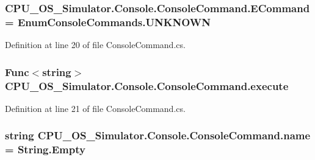 \subsubsection[{E\+Command}]{ C\+P\+U\+\_\+\+O\+S\+\_\+\+Simulator.\+Console.\+Console\+Command.\+E\+Command = {\bf Enum\+Console\+Commands.\+U\+N\+K\+N\+O\+W\+N}\hspace{0.3cm}{\ttfamily [private]}}\label{class_c_p_u___o_s___simulator_1_1_console_1_1_console_command_a623b0c35b5b676fa1931c62dde508486}


Definition at line 20 of file Console\+Command.\+cs.

\hypertarget{class_c_p_u___o_s___simulator_1_1_console_1_1_console_command_a14965572ab7b76a453e1dd49d268b48a}{}
\subsubsection[{execute}]{\setlength{\rightskip}{0pt plus 5cm}Func$<$string$>$ C\+P\+U\+\_\+\+O\+S\+\_\+\+Simulator.\+Console.\+Console\+Command.\+execute\hspace{0.3cm}{\ttfamily [private]}}\label{class_c_p_u___o_s___simulator_1_1_console_1_1_console_command_a14965572ab7b76a453e1dd49d268b48a}


Definition at line 21 of file Console\+Command.\+cs.

\hypertarget{class_c_p_u___o_s___simulator_1_1_console_1_1_console_command_a0ba819d58268ef4f9bab12089a9fd1a4}{}
\subsubsection[{name}]{\setlength{\rightskip}{0pt plus 5cm}string C\+P\+U\+\_\+\+O\+S\+\_\+\+Simulator.\+Console.\+Console\+Command.\+name = String.\+Empty\hspace{0.3cm}{\ttfamily [private]}}\label{class_c_p_u___o_s___simulator_1_1_console_1_1_console_command_a0ba819d58268ef4f9bab12089a9fd1a4}


